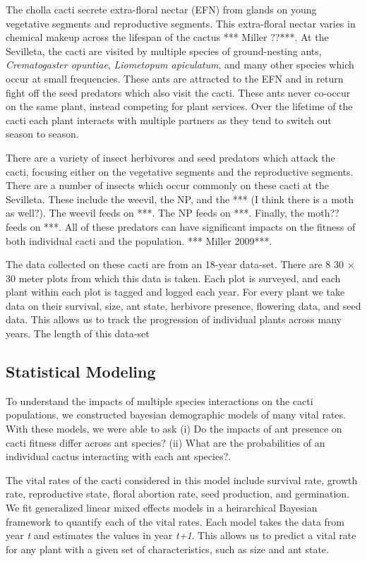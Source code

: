 \documentclass[12pt,a4paper]{article}
\begin{document}
	The cholla cacti secrete extra-floral nectar (EFN) from glands on young vegetative segments and reproductive segments. This extra-floral nectar varies in chemical makeup across the lifespan of the cactus *** Miller ??***. 
	At the Sevilleta, the cacti are visited by multiple species of ground-nesting ants, \textit{Crematogaster opuntiae}, \textit{Liometopum apiculatum}, and many other species which occur at small frequencies. These ants are attracted to the EFN and in return fight off the seed predators which also visit the cacti. These ants never co-occur on the same plant, instead competing for plant services. Over the lifetime of the cacti each plant interacts with multiple partners as they tend to switch out season to season.
	
	There are a variety of insect herbivores and seed predators which attack the cacti, focusing either on the vegetative segments and the reproductive segments. There are a number of insects which occur commonly on these cacti at the Sevilleta. These include the weevil, the NP, and the *** (I think there is a moth as well?). The weevil feeds on ***. The NP feeds on ***. Finally, the moth?? feeds on ***. All of these predators can have significant impacts on the fitness of both individual cacti and the population. *** Miller 2009***. 
	
	The data collected on these cacti are from an 18-year data-set. There are 8 30 $\times$ 30 meter plots from which this data is taken. Each plot is surveyed, and each plant within each plot is tagged and logged each year. For every plant we take data on their survival, size, ant state, herbivore presence, flowering data, and seed data. This allows us to track the progression of individual plants across many years. The length of this data-set 
	
	\subsection*{Statistical Modeling}
	To understand the impacts of multiple species interactions on the cacti populations, we constructed bayesian demographic models of many vital rates. With these models, we were able to ask (i) Do the impacts of ant presence on cacti fitness differ across ant species? (ii) What are the probabilities of an individual cactus interacting with each ant species?. 
	
	The vital rates of the cacti considered in this model include survival rate, growth rate, reproductive state, floral abortion rate, seed production, and germination. We fit generalized linear mixed effects models in a heirarchical Bayesian framework to quantify each of the vital rates. Each model takes the data from year \textit{t} and estimates the values in year \textit{t+1}. This allows us to predict a vital rate for any plant with a given set of characteristics, such as size and ant state. 
	\vspace{1cm}
	
\end{document}
